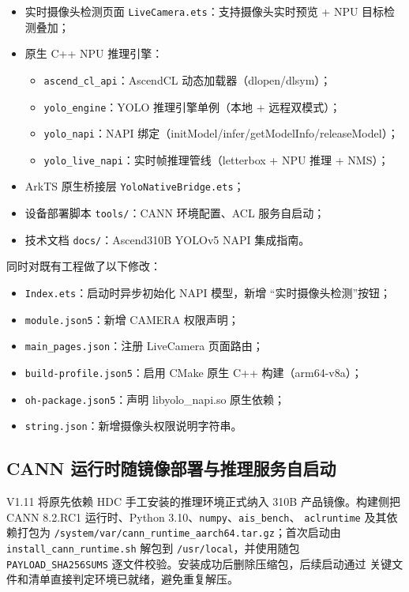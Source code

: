 \begin{itemize}
  \item 实时摄像头检测页面 \texttt{LiveCamera.ets}：支持摄像头实时预览 +
  NPU 目标检测叠加；
  \item 原生 C++ NPU 推理引擎：
  \begin{itemize}
    \item \texttt{ascend\_cl\_api}：AscendCL 动态加载器（dlopen/dlsym）；
    \item \texttt{yolo\_engine}：YOLO 推理引擎单例（本地 + 远程双模式）；
    \item \texttt{yolo\_napi}：NAPI 绑定（initModel/infer/getModelInfo/releaseModel）；
    \item \texttt{yolo\_live\_napi}：实时帧推理管线（letterbox + NPU 推理 + NMS）；
  \end{itemize}
  \item ArkTS 原生桥接层 \texttt{YoloNativeBridge.ets}；
  \item 设备部署脚本 \texttt{tools/}：CANN 环境配置、ACL 服务自启动；
  \item 技术文档 \texttt{docs/}：Ascend310B YOLOv5 NAPI 集成指南。
\end{itemize}

同时对既有工程做了以下修改：

\begin{itemize}
  \item \texttt{Index.ets}：启动时异步初始化 NAPI 模型，新增
  ``实时摄像头检测''按钮；
  \item \texttt{module.json5}：新增 CAMERA 权限声明；
  \item \texttt{main\_pages.json}：注册 LiveCamera 页面路由；
  \item \texttt{build-profile.json5}：启用 CMake 原生 C++ 构建（arm64-v8a）；
  \item \texttt{oh-package.json5}：声明 libyolo\_napi.so 原生依赖；
  \item \texttt{string.json}：新增摄像头权限说明字符串。
\end{itemize}

\subsection{CANN 运行时随镜像部署与推理服务自启动}

V1.11 将原先依赖 HDC 手工安装的推理环境正式纳入 310B 产品镜像。构建侧把
CANN 8.2.RC1 运行时、Python 3.10、\texttt{numpy}、\texttt{ais\_bench}、
\texttt{aclruntime} 及其依赖打包为
\texttt{/system/var/cann\_runtime\_aarch64.tar.gz}；首次启动由
\texttt{install\_cann\_runtime.sh} 解包到 \texttt{/usr/local}，并使用随包
\texttt{PAYLOAD\_SHA256SUMS} 逐文件校验。安装成功后删除压缩包，后续启动通过
关键文件和清单直接判定环境已就绪，避免重复解压。

